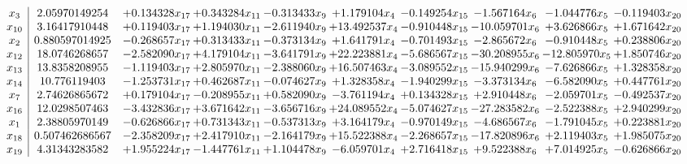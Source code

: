 \documentclass[10pt]{article}
\begin{document}
 \[\begin{array}{c| c c@{\hskip 2pt} c@{\hskip 2pt} c@{\hskip 2pt} c@{\hskip 2pt} c@{\hskip 2pt} c@{\hskip 2pt} c@{\hskip 2pt} c@{\hskip 2pt} }
 x_{3}   &  2.05970149254 & + 0.134328 x_{17} & + 0.343284 x_{11} & -0.313433 x_{9} & + 1.179104 x_{4} & -0.149254 x_{15} & -1.567164 x_{6} & -1.044776 x_{5} & -0.119403 x_{20}\\
 x_{10}   &  3.16417910448 & + 0.119403 x_{17} & + 1.194030 x_{11} & -2.611940 x_{9} & + 13.492537 x_{4} & -0.910448 x_{15} & -10.059701 x_{6} & + 3.626866 x_{5} & + 1.671642 x_{20}\\
 x_{2}   &  0.880597014925 & -0.268657 x_{17} & + 0.313433 x_{11} & -0.373134 x_{9} & + 1.641791 x_{4} & -0.701493 x_{15} & -2.865672 x_{6} & -0.910448 x_{5} & + 0.238806 x_{20}\\
 x_{12}   &  18.0746268657 & -2.582090 x_{17} & + 4.179104 x_{11} & -3.641791 x_{9} & + 22.223881 x_{4} & -5.686567 x_{15} & -30.208955 x_{6} & -12.805970 x_{5} & + 1.850746 x_{20}\\
 x_{13}   &  13.8358208955 & -1.119403 x_{17} & + 2.805970 x_{11} & -2.388060 x_{9} & + 16.507463 x_{4} & -3.089552 x_{15} & -15.940299 x_{6} & -7.626866 x_{5} & + 1.328358 x_{20}\\
 x_{14}   &  10.776119403 & -1.253731 x_{17} & + 0.462687 x_{11} & -0.074627 x_{9} & + 1.328358 x_{4} & -1.940299 x_{15} & -3.373134 x_{6} & -6.582090 x_{5} & + 0.447761 x_{20}\\
 x_{7}   &  2.74626865672 & + 0.179104 x_{17} & -0.208955 x_{11} & + 0.582090 x_{9} & -3.761194 x_{4} & + 0.134328 x_{15} & + 2.910448 x_{6} & -2.059701 x_{5} & -0.492537 x_{20}\\
 x_{16}   &  12.0298507463 & -3.432836 x_{17} & + 3.671642 x_{11} & -3.656716 x_{9} & + 24.089552 x_{4} & -5.074627 x_{15} & -27.283582 x_{6} & -2.522388 x_{5} & + 2.940299 x_{20}\\
 x_{1}   &  2.38805970149 & -0.626866 x_{17} & + 0.731343 x_{11} & -0.537313 x_{9} & + 3.164179 x_{4} & -0.970149 x_{15} & -4.686567 x_{6} & -1.791045 x_{5} & + 0.223881 x_{20}\\
 x_{18}   &  0.507462686567 & -2.358209 x_{17} & + 2.417910 x_{11} & -2.164179 x_{9} & + 15.522388 x_{4} & -2.268657 x_{15} & -17.820896 x_{6} & + 2.119403 x_{5} & + 1.985075 x_{20}\\
 x_{19}   &  4.31343283582 & + 1.955224 x_{17} & -1.447761 x_{11} & + 1.104478 x_{9} & -6.059701 x_{4} & + 2.716418 x_{15} & + 9.522388 x_{6} & + 7.014925 x_{5} & -0.626866 x_{20}\\

\end{array}\]
\end{document}
